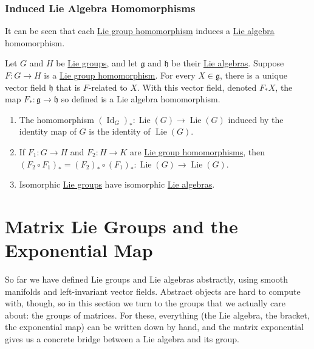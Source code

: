 \documentclass{article}
\DeclareMathOperator{\Id}{Id}
\DeclareMathOperator{\Lie}{Lie}
\newcounter{theorem}[section]
\begin{document}
    \subsubsection{Induced Lie Algebra Homomorphisms}

      It can be seen that each \hyperref[def:lie-group-homomorphism]{Lie group homomorphism} induces a \hyperref[def:lie-algebra]{Lie algebra} homomorphism. 

      \begin{theorem}
        \label{thm:induced-lie-algebra-homomorphism}
      Let $G$ and $H$ be \hyperref[def:lie-group]{Lie groups}, and let $\mathfrak{g}$ and $\mathfrak{h}$ be their \hyperref[def:lie-algebra]{Lie algebras}. Suppose $F: G \to H$ is a \hyperref[def:lie-group-homomorphism]{Lie group homomorphism}. For every $X \in \mathfrak{g}$, there is a unique vector field $\mathfrak{h}$ that is $F$-related to $X$. With this vector field, denoted $F_* X$, the map $F_*: \mathfrak{g} \to \mathfrak{h}$ so defined is a Lie algebra homomorphism. 
      \end{theorem}

      \begin{lemma}
        \label{thm:properties-of-the-induced-homomorphism}
      \begin{enumerate}
          \item The homomorphism $(\Id_G)_* : \Lie (G) \to \Lie(G)$ induced by the identity map of $G$ is the identity of $\Lie(G)$. 
          \item If $F_1: G \to H$ and $F_2: H \to K$ are \hyperref[def:lie-group-homomorphism]{Lie group homomorphisms}, then $(F_2 \circ F_1)_* = (F_2)_* \circ (F_1)_* : \Lie(G) \to \Lie(G)$. 
          \item Isomorphic \hyperref[def:lie-group]{Lie groups} have isomorphic \hyperref[def:lie-algebra]{Lie algebras}. 
      \end{enumerate}
      \end{lemma}

\section{Matrix Lie Groups and the Exponential Map}
  \label{sec:matrix-lie-groups}

  So far we have defined Lie groups and Lie algebras abstractly, using smooth manifolds and left-invariant vector fields. Abstract objects are hard to compute with, though, so in this section we turn to the groups that we actually care about: the groups of matrices. For these, everything (the Lie algebra, the bracket, the exponential map) can be written down by hand, and the matrix exponential gives us a concrete bridge between a Lie algebra and its group. 
\end{document}
